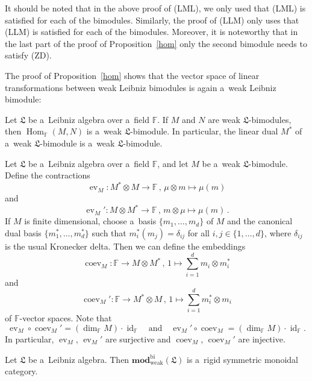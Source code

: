 \documentclass{jonasart}
\DeclareMathOperator{\bi}{bi}
\DeclareMathOperator{\coev}{coev}
\DeclareMathOperator{\ev}{ev}
\DeclareMathOperator{\Hom}{Hom}
\DeclareMathOperator{\id}{id}
\DeclareMathOperator{\weak}{weak}
\newcommand{\fbb}{\mathbb{F}}
\newcommand{\fdmod}{\mathbf{mod}}
\newcommand{\lf}{\mathfrak{L}}
\begin{document}
	\begin{remark}
		It should be noted that in the above proof of (LML), we only used that
		(LML) is satisfied for each of the bimodules. Similarly, the proof of (LLM) only uses that (LLM) is satisfied for each of the bimodules. Moreover, it is noteworthy that in the last part of the proof of Proposition~\ref{hom} only the second bimodule needs to satisfy (ZD).
	\end{remark}

	The proof of Proposition~\ref{hom} shows that the vector space of linear transformations between weak Leibniz bimodules is again a~weak Leibniz bimodule:

    \begin{proposition}
		Let $\lf$ be a~Leibniz algebra over a~field $\fbb$. If $M$ and $N$ are weak
		$\lf$-bimodules, then $\Hom_\fbb(M,N)$ is a~weak $\lf$-bimodule. In particular, the linear dual $M^*$ of a~weak $\lf$-bimodule is a~weak $\lf$-bimodule.
	\end{proposition}

	Let $\lf$ be a~Leibniz algebra over a~field $\fbb$, and let $M$ be a~weak
	$\lf$-bimodule. Define the contractions
	\[
		\ev_M:M^*\otimes M\to\fbb\,,\,\mu\otimes m\mapsto\mu(m)
	\]
	and
	\[
		\ev_M ':M\otimes M^*\to\fbb\,,\,m\otimes\mu\mapsto\mu(m)\,.
	\]
	If $M$ is finite dimensional, choose a~basis $\{m_1,\dots,m_d\}$ of
	$M$ and the canonical dual basis $\{m_1^*,\dots,m_d^*\}$ such that $m_i^* (m_j )=\delta_{ij}$ for all $i,j\in\{1,\dots,d\}$, where
	$\delta_{ij}$ is the usual Kronecker delta. Then we can define the embeddings
	\[
		\coev_M:\fbb\to M\otimes M^*\,,\,1\mapsto\sum_{i=1}^d m_i
		\otimes m_i^*
	\]
	and
	\[
		\coev_M ':\fbb\to M^*\otimes M\,,\,1\mapsto\sum_{i=1}^d m_i^*
		\otimes m_i
	\]
	of $\fbb$-vector spaces. Note that
    \[
        \ev_M\circ\coev_M '
        = (\dim_\fbb M)\cdot\id_\fbb
        \quad \text{and} \quad
        \ev_M '\circ\coev_M
        = (\dim_\fbb M)\cdot\id_\fbb.
    \]
    In particular, $\ev_M$, $\ev_M '$ are surjective and $\coev_M$, $\coev_M '$ are injective.
	\begin{theorem}\label{rigid}
		Let $\lf$ be a~Leibniz algebra. Then $\fdmod_{\weak}^{\bi}(\lf)$ is a~rigid symmetric monoidal category.
	\end{theorem}
\end{document}
